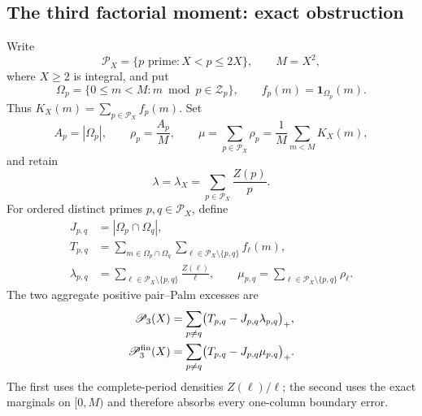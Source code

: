 
\subsection*{The third factorial moment: exact obstruction}

Write
\[
  \mathcal P_X=\{p\text{ prime}:X<p\le 2X\},\qquad M=X^2,
\]
where $X\ge 2$ is integral, and put
\[
  \Omega_p=\{0\le m<M:m\bmod p\in\mathcal Z_p\},\qquad
  f_p(m)=\mathbf 1_{\Omega_p}(m).
\]
Thus $K_X(m)=\sum_{p\in\mathcal P_X}f_p(m)$.  Set
\[
  A_p=|\Omega_p|,\qquad \rho_p=\frac{A_p}{M},\qquad
  \mu=\sum_{p\in\mathcal P_X}\rho_p
      =\frac1M\sum_{m<M}K_X(m),
\]
and retain
\[
  \lambda=\lambda_X=\sum_{p\in\mathcal P_X}\frac{Z(p)}p.
\]
For ordered distinct primes $p,q\in\mathcal P_X$, define
\begin{align*}
  J_{p,q}&=|\Omega_p\cap\Omega_q|,\\
  T_{p,q}&=\sum_{m\in\Omega_p\cap\Omega_q}
       \sum_{\ell\in\mathcal P_X\setminus\{p,q\}}f_\ell(m),\\
  \lambda_{p,q}&=\sum_{\ell\in\mathcal P_X\setminus\{p,q\}}
       \frac{Z(\ell)}\ell,\qquad
  \mu_{p,q}=\sum_{\ell\in\mathcal P_X\setminus\{p,q\}}\rho_\ell.
\end{align*}
The two aggregate positive pair--Palm excesses are
\begin{align}
  \mathscr P_3(X)
    &=\sum_{p\ne q}\bigl(T_{p,q}-J_{p,q}\lambda_{p,q}\bigr)_+,
       \label{eq:hm3-palm-periodic}\\
  \mathscr P_3^{\rm fin}(X)
    &=\sum_{p\ne q}\bigl(T_{p,q}-J_{p,q}\mu_{p,q}\bigr)_+.
       \label{eq:hm3-palm-finite}
\end{align}
The first uses the complete-period densities $Z(\ell)/\ell$; the second
uses the exact marginals on $[0,M)$ and therefore absorbs every one-column
boundary error.

